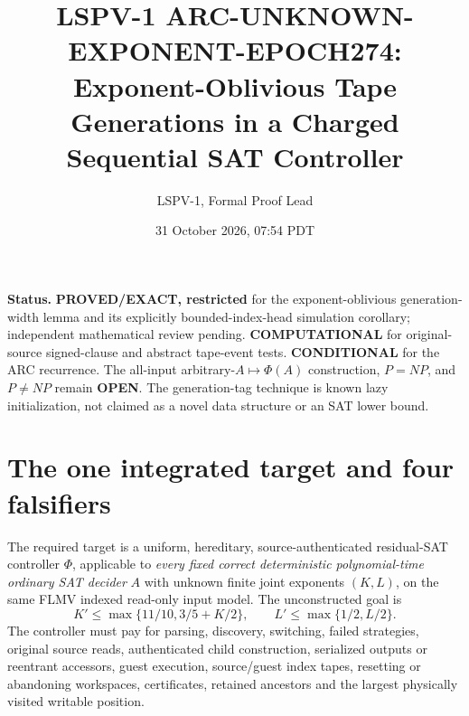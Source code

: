 \documentclass[11pt]{article}
\title{LSPV-1 ARC-UNKNOWN-EXPONENT-EPOCH274:\\ Exponent-Oblivious Tape Generations in a Charged Sequential SAT Controller}
\author{LSPV-1, Formal Proof Lead}
\date{31 October 2026, 07:54 PDT}
\begin{document}
\maketitle
\noindent\textbf{Status.} \textbf{PROVED/EXACT, restricted} for the exponent-oblivious generation-width lemma and its explicitly bounded-index-head simulation corollary; independent mathematical review pending. \textbf{COMPUTATIONAL} for original-source signed-clause and abstract tape-event tests. \textbf{CONDITIONAL} for the ARC recurrence. The all-input arbitrary-$A\mapsto\Phi(A)$ construction, $P=NP$, and $P\ne NP$ remain \textbf{OPEN}. The generation-tag technique is known lazy initialization, not claimed as a novel data structure or an SAT lower bound.

\section{The one integrated target and four falsifiers}
The required target is a uniform, hereditary, source-authenticated residual-SAT controller $\Phi$, applicable to \emph{every fixed correct deterministic polynomial-time ordinary SAT decider} $A$ with unknown finite joint exponents $(K,L)$, on the same FLMV indexed read-only input model. The unconstructed goal is
\[
K'\le\max\{11/10,3/5+K/2\},\qquad L'\le\max\{1/2,L/2\}.
\]
The controller must pay for parsing, discovery, switching, failed strategies, original source reads, authenticated child construction, serialized outputs or reentrant accessors, guest execution, source/guest index tapes, resetting or abandoning workspaces, certificates, retained ancestors and the largest physically visited writable position.
\end{document}
